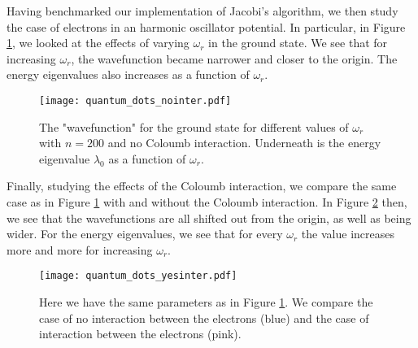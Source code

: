 Having benchmarked our implementation of Jacobi's algorithm, we then study the case
of electrons in an harmonic oscillator potential. In particular, in Figure
\ref{fig:quantum_dots_nointer}, we looked at the effects of varying $\omega_r$ in the
ground state. We see that for increasing $\omega_r$, the wavefunction became
narrower and closer to the origin. The energy eigenvalues also increases as a function of $\omega_r$.
\begin{figure}[htbp]
	\centering
	\texttt{[image: quantum\_dots\_nointer.pdf]}
	\caption{The "wavefunction" for the ground state for different values of $\omega_r$ with $n=200$ and no Coloumb interaction.
	Underneath is the energy eigenvalue $\lambda_0$ as a function of $\omega_r$.}
	\label{fig:quantum_dots_nointer}
\end{figure}


Finally, studying the effects of the Coloumb interaction, we compare the same case
as in Figure \ref{fig:quantum_dots_nointer} with and without the Coloumb interaction.
In Figure \ref{fig:quantum_dots_yesinter} then, we see that the wavefunctions are
all shifted out from the origin, as well as being wider. For the energy eigenvalues,
we see that for every $\omega_r$ the value increases more and more for increasing $\omega_r$.
\begin{figure}[htbp]
	\centering
	\texttt{[image: quantum\_dots\_yesinter.pdf]}
	\caption{Here we have the same parameters as in Figure \ref{fig:quantum_dots_nointer}.
	We compare the case of no interaction between the electrons (blue) and the case of
	interaction between the electrons (pink).}
	\label{fig:quantum_dots_yesinter}
\end{figure}
